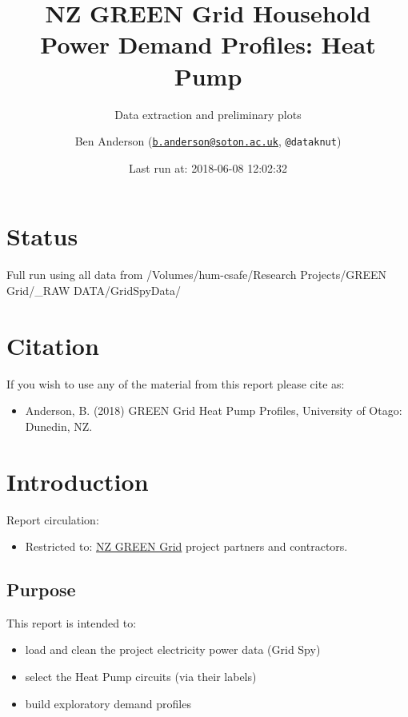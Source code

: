 \documentclass[]{article}
\title{NZ GREEN Grid Household Power Demand Profiles: Heat Pump}
\subtitle{Data extraction and preliminary plots}
\author{Ben Anderson
(\href{mailto:b.anderson@soton.ac.uk}{\nolinkurl{b.anderson@soton.ac.uk}},
\texttt{@dataknut})}
\date{Last run at: 2018-06-08 12:02:32}
\providecommand{\tightlist}{%
  \setlength{\itemsep}{0pt}\setlength{\parskip}{0pt}}
\begin{document}
\maketitle

{
\setcounter{tocdepth}{2}
\tableofcontents
}
\newpage

\section{Status}\label{status}

Full run using all data from /Volumes/hum-csafe/Research Projects/GREEN
Grid/\_RAW DATA/GridSpyData/

\section{Citation}\label{citation}

If you wish to use any of the material from this report please cite as:

\begin{itemize}
\tightlist
\item
  Anderson, B. (2018) GREEN Grid Heat Pump Profiles, University of
  Otago: Dunedin, NZ.
\end{itemize}

\newpage

\section{Introduction}\label{introduction}

Report circulation:

\begin{itemize}
\tightlist
\item
  Restricted to:
  \href{https://www.otago.ac.nz/centre-sustainability/research/energy/otago050285.html}{NZ
  GREEN Grid} project partners and contractors.
\end{itemize}

\subsection{Purpose}\label{purpose}

This report is intended to:

\begin{itemize}
\tightlist
\item
  load and clean the project electricity power data (Grid Spy)
\item
  select the Heat Pump circuits (via their labels)
\item
  build exploratory demand profiles
\end{itemize}
\end{document}
